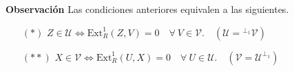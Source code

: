 \documentclass[preview]{standalone}
\begin{document}
\begin{center}
\justifying \textbf{Observación} Las condiciones anteriores equivalen a las siguientes.\begin{itemize} \item[$(\ast)$] $Z\in\mathcal{U} \Leftrightarrow \text{Ext}^1_R(Z,V)=0 \quad \forall \ V\in\mathcal{V}. \quad (\mathcal{U} = {}^{\perp_1}\mathcal{V})$ \item[$(\ast\ast)$] $X\in\mathcal{V} \Leftrightarrow \text{Ext}^1_R(U,X)=0 \quad \forall \ U\in\mathcal{U}. \quad (\mathcal{V} = \mathcal{U}^{\perp_1} )$ \end{itemize}
\end{center}
\end{document}
